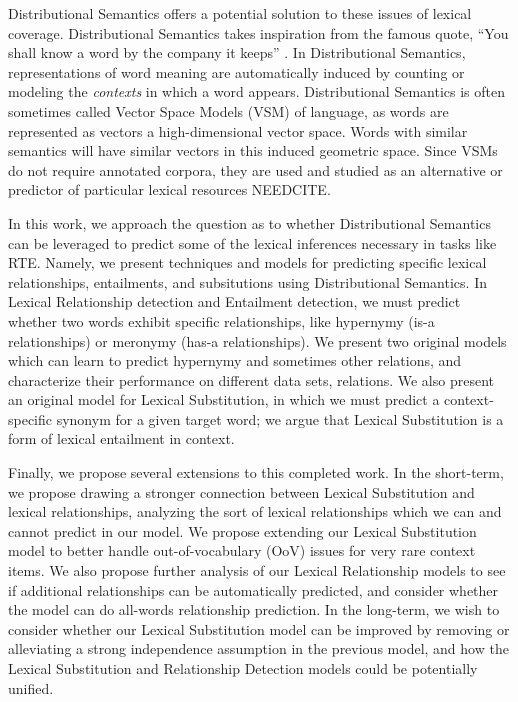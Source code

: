 \documentclass[letterpaper]{article}
\begin{document}
Distributional Semantics offers a potential solution to these issues of lexical
coverage. Distributional Semantics takes inspiration from the famous quote,
``You shall know a word by the company it keeps'' \cite{firth:1957:la}. In
Distributional Semantics, representations of word meaning are automatically
induced by counting or modeling the {\em contexts} in which a word appears.
Distributional Semantics is often sometimes called Vector Space Models (VSM) of
language, as words are represented as vectors a high-dimensional vector space.
Words with similar semantics will have similar vectors in this induced
geometric space. Since VSMs do not require annotated corpora, they are used and
studied as an alternative or predictor of particular lexical resources NEEDCITE.

In this work, we approach the question as to whether Distributional Semantics
can be leveraged to predict some of the lexical inferences necessary in tasks
like RTE. Namely, we present techniques and models for predicting specific
lexical relationships, entailments, and subsitutions using Distributional
Semantics. In Lexical Relationship detection and Entailment detection, we must
predict whether two words exhibit specific relationships, like hypernymy (is-a
relationships) or meronymy (has-a relationships). We present two original
models which can learn to predict hypernymy and sometimes other relations,
and characterize their performance on different data sets, relations. We also
present an original model for Lexical Substitution, in which we must predict a
context-specific synonym for a given target word; we argue that Lexical
Substitution is a form of lexical entailment in context.

Finally, we propose several extensions to this completed work. In the
short-term, we propose drawing a stronger connection between Lexical
Substitution and lexical relationships, analyzing the sort of lexical
relationships which we can and cannot predict in our model. We propose
extending our Lexical Substitution model to better handle out-of-vocabulary
(OoV) issues for very rare context items. We also propose further analysis of
our Lexical Relationship models to see if additional relationships can be
automatically predicted, and consider whether the model can do all-words
relationship prediction.  In the long-term, we wish to consider whether our
Lexical Substitution model can be improved by removing or alleviating a strong
independence assumption in the previous model, and how the Lexical Substitution
and Relationship Detection models could be potentially unified.
\end{document}
